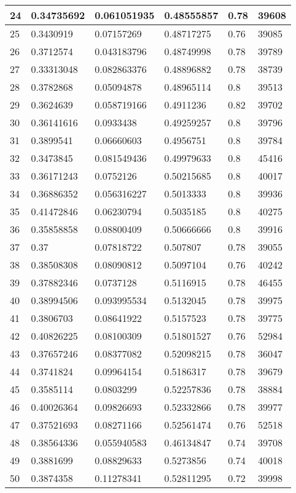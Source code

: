 \begin{longtable}{|l|l|l|l|l|l|}
24 & 0.34735692 & 0.061051935 & 0.48555857 & 0.78 & 39608 \\ \hline 
25 & 0.3430919 & 0.07157269 & 0.48717275 & 0.76 & 39085 \\ \hline 
26 & 0.3712574 & 0.043183796 & 0.48749998 & 0.78 & 39789 \\ \hline 
27 & 0.33313048 & 0.082863376 & 0.48896882 & 0.78 & 38739 \\ \hline 
28 & 0.3782868 & 0.05094878 & 0.48965114 & 0.8 & 39513 \\ \hline 
29 & 0.3624639 & 0.058719166 & 0.4911236 & 0.82 & 39702 \\ \hline 
30 & 0.36141616 & 0.0933438 & 0.49259257 & 0.8 & 39796 \\ \hline 
31 & 0.3899541 & 0.06660603 & 0.4956751 & 0.8 & 39784 \\ \hline 
32 & 0.3473845 & 0.081549436 & 0.49979633 & 0.8 & 45416 \\ \hline 
33 & 0.36171243 & 0.0752126 & 0.50215685 & 0.8 & 40017 \\ \hline 
34 & 0.36886352 & 0.056316227 & 0.5013333 & 0.8 & 39936 \\ \hline 
35 & 0.41472846 & 0.06230794 & 0.5035185 & 0.8 & 40275 \\ \hline 
36 & 0.35858858 & 0.08800409 & 0.50666666 & 0.8 & 39916 \\ \hline 
37 & 0.37 & 0.07818722 & 0.507807 & 0.78 & 39055 \\ \hline 
38 & 0.38508308 & 0.08090812 & 0.5097104 & 0.76 & 40242 \\ \hline 
39 & 0.37882346 & 0.0737128 & 0.5116915 & 0.78 & 46455 \\ \hline 
40 & 0.38994506 & 0.093995534 & 0.5132045 & 0.78 & 39975 \\ \hline 
41 & 0.3806703 & 0.08641922 & 0.5157523 & 0.78 & 39775 \\ \hline 
42 & 0.40826225 & 0.08100309 & 0.51801527 & 0.76 & 52984 \\ \hline 
43 & 0.37657246 & 0.08377082 & 0.52098215 & 0.78 & 36047 \\ \hline 
44 & 0.3741824 & 0.09964154 & 0.5186317 & 0.78 & 39679 \\ \hline 
45 & 0.3585114 & 0.0803299 & 0.52257836 & 0.78 & 38884 \\ \hline 
46 & 0.40026364 & 0.09826693 & 0.52332866 & 0.78 & 39977 \\ \hline 
47 & 0.37521693 & 0.08271166 & 0.52561474 & 0.76 & 52518 \\ \hline 
48 & 0.38564336 & 0.055940583 & 0.46134847 & 0.74 & 39708 \\ \hline 
49 & 0.3881699 & 0.08829633 & 0.5273856 & 0.74 & 40018 \\ \hline 
50 & 0.3874358 & 0.11278341 & 0.52811295 & 0.72 & 39998 \\ \hline 
\end{longtable}